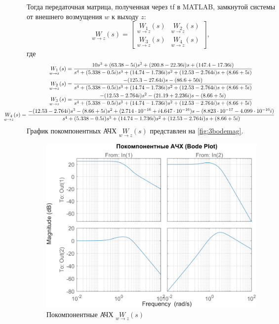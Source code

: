 Тогда передаточная матрица, полученная через tf в MATLAB, замкнутой системы от внешнего возмущения $w$ к выходу $z$:
\begin{equation*}
    \underset{w\rightarrow z}{W}(s)=\begin{bmatrix}
        \underset{w\rightarrow z}{W_1}(s) & \underset{w\rightarrow z}{W_2}(s)\\
        \underset{w\rightarrow z}{W_3}(s) & \underset{w\rightarrow z}{W_4}(s)
    \end{bmatrix},
\end{equation*}
где
\begin{gather*}
    \underset{w\rightarrow z}{W_1}(s)=\dfrac{10 s^3 + (63.38-5i) s^2 + (200.8-22.36i) s + (147.4-17.36i)}{s^4 + (5.338-0.5i) s^3 + (14.74-1.736i) s^2 + (12.53-2.764i) s + (8.66+5i)}\\
    \underset{w\rightarrow z}{W_2}(s)=\dfrac{-(125.3-27.64i) s - (86.6+50i)}{s^4 + (5.338-0.5i) s^3 + (14.74-1.736i) s^2 + (12.53-2.764i) s + (8.66+5i)}\\
    \underset{w\rightarrow z}{W_3}(s)=\dfrac{-(12.53-2.764i) s^2 - (21.19+2.236i) s - (8.66+5i)}{s^4 + (5.338-0.5i) s^3 + (14.74-1.736i) s^2 + (12.53-2.764i) s + (8.66+5i)} \\
    \hspace*{-1.5cm} \underset{w\rightarrow z}{W_4}(s)=\dfrac{-(12.53-2.764i) s^3 - (8.66+5i) s^2 + (2.714\cdot 10^{-16}+i4.647\cdot 10^{-16}) s - (8.823\cdot 10^{-17}-4.099\cdot 10^{-16}i)}{s^4 + (5.338-0.5i) s^3 + (14.74-1.736i) s^2 + (12.53-2.764i) s + (8.66+5i)}
\end{gather*}
График покомпонентных АЧХ $\underset{w\rightarrow z}{W}(s)$ представлен на \autoref{fig:3bodemag}.
\begin{figure}[H]
    \centering
    \includegraphics[width=0.7\linewidth]{figs/3_bodemag.png}
    \caption{Покомпонентные АЧХ $\underset{w\rightarrow z}{W}(s)$}
    \label{fig:3bodemag}
\end{figure}
